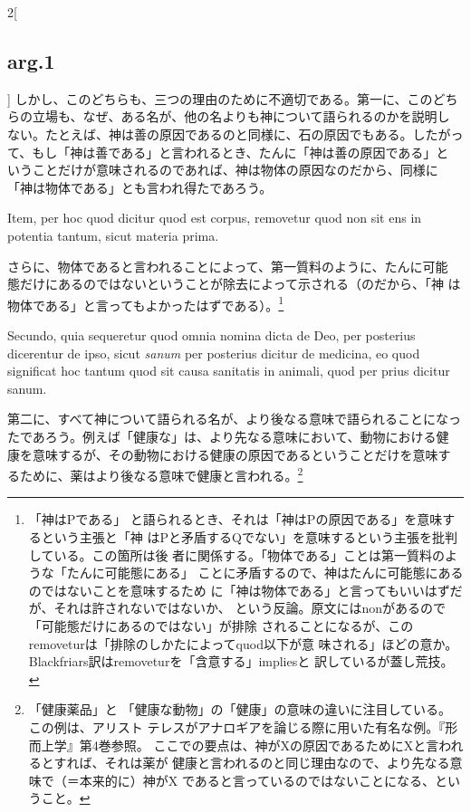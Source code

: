 \documentclass[paper=a4paper,fontsize=10pt,jafontsize=9pt,titlepage]{jlreq}
\begin{document}
\begin{paracol}{2}[\subsection{arg.1}]
しかし、このどちらも、三つの理由のために不適切である。第一に、このどち
らの立場も、なぜ、ある名が、他の名よりも神について語られるのかを説明し
ない。たとえば、神は善の原因であるのと同様に、石の原因でもある。したがっ
て、もし「神は善である」と言われるとき、たんに「神は善の原因である」と
いうことだけが意味されるのであれば、神は物体の原因なのだから、同様に
「神は物体である」とも言われ得たであろう。

\switchcolumn*

Item, per hoc quod dicitur quod est corpus, removetur quod non sit ens
in potentia tantum, sicut materia prima.

\switchcolumn

さらに、物体であると言われることによって、第一質料のように、たんに可能
態だけにあるのではないということが除去によって示される（のだから、「神
は物体である」と言ってもよかったはずである）。\footnote{「神はPである」
と語られるとき、それは「神はPの原因である」を意味するという主張と「神
はPと矛盾するQでない」を意味するという主張を批判している。この箇所は後
者に関係する。「物体である」ことは第一質料のような「たんに可能態にある」
ことに矛盾するので、神はたんに可能態にあるのではないことを意味するため
に「神は物体である」と言ってもいいはずだが、それは許されないではないか、
という反論。原文にはnonがあるので「可能態だけにあるのではない」が排除
されることになるが、このremoveturは「排除のしかたによってquod以下が意
味される」ほどの意か。Blackfriars訳はremoveturを「含意する」impliesと
訳しているが蓋し荒技。}

\switchcolumn*

Secundo, quia sequeretur quod omnia nomina dicta de Deo, per posterius
dicerentur de ipso, sicut {\itshape sanum} per posterius dicitur de
medicina, eo quod significat hoc tantum quod sit causa sanitatis in
animali, quod per prius dicitur sanum.

\switchcolumn

第二に、すべて神について語られる名が、より後なる意味で語られることになっ
たであろう。例えば「健康な」は、より先なる意味において、動物における健
康を意味するが、その動物における健康の原因であるということだけを意味す
るために、薬はより後なる意味で健康と言われる。\footnote{「健康薬品」と
「健康な動物」の「健康」の意味の違いに注目している。この例は、アリスト
テレスがアナロギアを論じる際に用いた有名な例。『形而上学』第4巻参照。
ここでの要点は、神がXの原因であるためにXと言われるとすれば、それは薬が
健康と言われるのと同じ理由なので、より先なる意味で（＝本来的に）神がX
であると言っているのではないことになる、ということ。}


\end{paracol}
\end{document}
